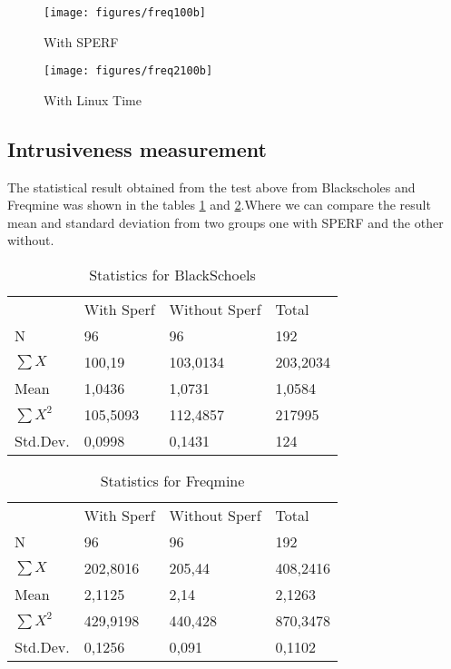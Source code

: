 \documentclass[sigconf]{acmart}
\begin{document}
\begin{figure}[H]
	\texttt{[image: figures/freq100b]}
	\caption{With SPERF}
	\label{fig:freq100b}
\end{figure}

\begin{figure}[H]
  \texttt{[image: figures/freq2100b]}
  \caption{With Linux Time}
  \label{fig:freq2100b}
\end{figure}


\subsection{Intrusiveness measurement}

The statistical result obtained from the test above from Blackscholes and Freqmine was shown in the tables \ref{tab:blackstatistics} and \ref{tab:freqstatistics}.Where we can compare the result mean and standard deviation from two groups one with SPERF and the other without.

\begin{table}[H]
\centering
\caption{Statistics for BlackSchoels}
\label{tab:blackstatistics}
\begin{tabular}{llll}
                & With Sperf & Without Sperf & Total    \\
N               & 96         & 96            & 192      \\
$\sum{X}$       & 100,19     & 103,0134      & 203,2034 \\
Mean            & 1,0436     & 1,0731        & 1,0584   \\
$\sum{X^2}$     & 105,5093   & 112,4857      & 217995   \\
Std.Dev.        & 0,0998     & 0,1431        & 124     
\end{tabular}
\end{table}

\begin{table}[H]
\centering
\caption{Statistics for Freqmine}
\label{tab:freqstatistics}
\begin{tabular}{llll}
            & With Sperf & Without Sperf & Total    \\
N           & 96         & 96            & 192      \\
$\sum{X}$   & 202,8016   & 205,44        & 408,2416 \\
Mean        & 2,1125     & 2,14          & 2,1263   \\
$\sum{X^2}$ & 429,9198   & 440,428       & 870,3478 \\
Std.Dev.    & 0,1256     & 0,091         & 0,1102  
\end{tabular}
\end{table}
\end{document}
